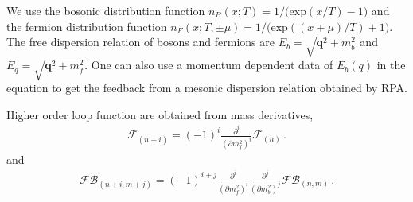\documentclass[reprint,english,superscriptaddress,preprintnumbers,amsmath,amssymb,aps,prd]{revtex4-2}
\begin{document}
%
We use the bosonic distribution function $n_B(x;T)=1/\big(\mathrm{exp}(x/T)-1\big)$ and the fermion distribution function $n_F(x;T,\pm\mu)=1/\big(\mathrm{exp}((x\mp\mu)/T)+1\big)$. The free dispersion relation of bosons and fermions are $E_b=\sqrt{\boldsymbol{q}^2+m_b^2}$ and $E_q=\sqrt{\boldsymbol{q}^2+m_f^2}$. One can also use a momentum dependent data of $E_b(q)$ in the equation to get the feedback from a mesonic dispersion relation obtained by RPA.

Higher order loop function are obtained from mass derivatives,
%
\begin{align}
\mathcal{F}_{(n+i)}=(-1)^{i}\frac{\partial^i}{(\partial m_f^2)^i}\mathcal{F}_{(n)}\,.
\end{align}
%
and
%
\begin{align}
\mathcal{FB}_{(n+i,m+j)}=(-1)^{i+j}\frac{\partial^i}{(\partial m_f^2)^i}\frac{\partial^j}{(\partial m_b^2)^j}\mathcal{FB}_{(n,m)}\,.
\end{align}
%





\end{document}
